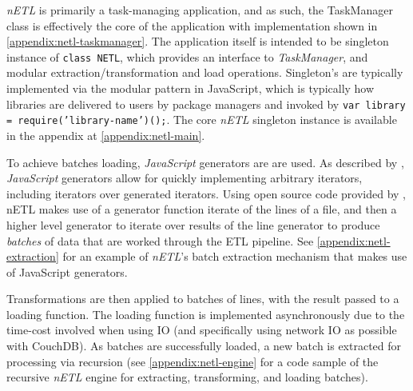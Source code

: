 \textit{nETL} is primarily a task-managing application, and as such, the TaskManager class is effectively the core of the application with implementation shown in \ref{appendix:netl-taskmanager}. The application itself is intended to be singleton instance of \texttt{class NETL{}}, which provides an interface to \textit{TaskManager}, and modular extraction/transformation and load operations. Singleton's are typically implemented via the modular pattern in JavaScript, which is typically how libraries are delivered to users by package managers and invoked by \texttt{var library = require('library-name')();}. The core \textit{nETL} singleton instance is available in the appendix at \ref{appendix:netl-main}.

To achieve batches loading, \textit{JavaScript} generators are are used. As described by \cite{mozillaGenerators}, \textit{JavaScript} generators allow for quickly implementing arbitrary iterators, including iterators over generated iterators. Using open source code provided by \cite{bower16}, nETL makes use of a generator function iterate of the lines of a file, and then a higher level generator to iterate over results of the line generator to produce \textit{batches} of data that are worked through the ETL pipeline. See \ref{appendix:netl-extraction} for an example of \textit{nETL}'s batch extraction mechanism that makes use of JavaScript generators.

Transformations are then applied to batches of lines, with the result passed to a loading function. The loading function is implemented asynchronously due to the time-cost involved when using IO (and specifically using network IO as possible with CouchDB). As batches are successfully loaded, a new batch is extracted for processing via recursion (see \ref{appendix:netl-engine} for a code sample of the recursive \textit{nETL} engine for extracting, transforming, and loading batches).